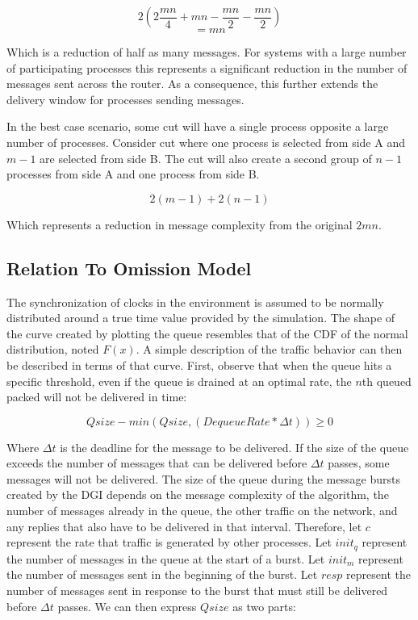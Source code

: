 \begin{equation}
2( 2 \frac{mn}{4} + mn - \frac{mn}{2} - \frac{mn}{2})
\end{equation}
\begin{equation}
= mn
\end{equation}

Which is a reduction of half as many messages.
For systems with a large number of participating processes this represents a significant reduction in the number of messages sent across the router.
As a consequence, this further extends the delivery window for processes sending messages.

In the best case scenario, some cut will have a single process opposite a large number of processes.
Consider cut where one process is selected from side A and $m-1$ are selected from side B.
The cut will also create a second group of $n-1$ processes from side A and one process from side B.

\begin{equation}
2(m-1) + 2(n-1)
\end{equation}

Which represents a reduction in message complexity from the original $2mn$.

\subsection{Relation To Omission Model}

The synchronization of clocks in the environment is assumed to be normally distributed around a true time value provided by the simulation.
The shape of the curve created by plotting the queue resembles that of the \ac{CDF} of the normal distribution, noted $F(x)$.
A simple description of the traffic behavior can then be described in terms of that curve.
First, observe that when the queue hits a specific threshold, even if the queue is drained at an optimal rate, the $n$th queued packed will not be delivered in time:

\begin{equation}
Qsize - min(Qsize, (DequeueRate * \Delta t)) \geq 0
\label{eq:origin}
\end{equation}

Where $\Delta t$ is the deadline for the message to be delivered.
If the size of the queue exceeds the number of messages that can be delivered before $\Delta t$ passes, some messages will not be delivered.
The size of the queue during the message bursts created by the DGI depends on the message complexity of the algorithm, the number of messages already in the queue, the other traffic on the network, and any replies that also have to be delivered in that interval.
Therefore, let $c$ represent the rate that traffic is generated by other processes.
Let $init_q$ represent the number of messages in the queue at the start of a burst. 
Let $init_m$ represent the number of messages sent in the beginning of the burst.
Let $resp$ represent the number of messages sent in response to the burst that must still be delivered before $\Delta t$ passes.
We can then express $Qsize$ as two parts:

